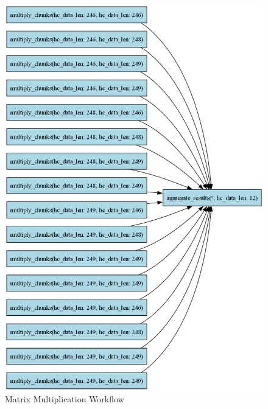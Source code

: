 \documentclass[conference]{IEEEtran}
\begin{document}
\begin{figure}[H]
    \centering
    \includegraphics[width=\columnwidth]{figures/dag_image_gemm.png}
    \caption{Matrix Multiplication Workflow}
    \label{fig:matrix_multiplication}
\end{figure}
\end{document}
